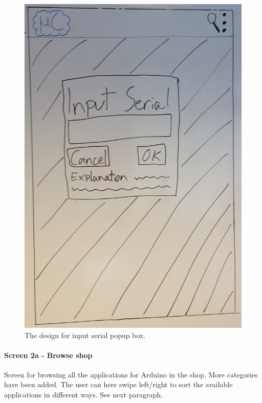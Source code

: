 \begin{figure}[H]
\centering
\includegraphics[scale=0.2]{images/Design_guide/Screen1b-i.png}
\caption[Screen 1b-i - Input serial]{The design for input serial popup box.}
\label{fig:screen1bi}
\end{figure}


\paragraph{Screen 2a - Browse shop}
Screen for browsing all the applications for Arduino in the shop. More categories have been added. The user can here swipe left/right to sort the available applications in different ways. See next paragraph.

